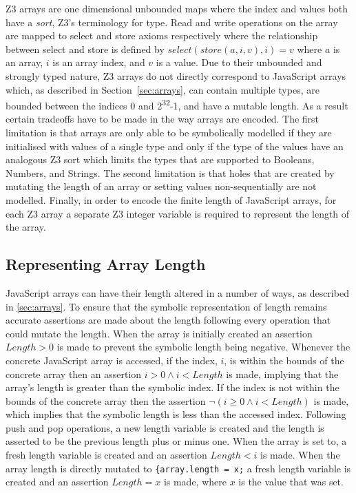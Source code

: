 \documentclass[]{final_report}
\begin{document}
Z3 arrays are one dimensional unbounded maps where the index and values both have a \textit{sort}, Z3's terminology for type. Read and write operations on the array are mapped to select and store axioms respectively where the relationship between select and store is defined by $select(store(a, i, v), i) = v$ where $a$ is an array, $i$ is an array index, and $v$ is a value. Due to their unbounded and strongly typed nature, Z3 arrays do not directly correspond to JavaScript arrays which, as described in Section~\ref{sec:arrays}, can contain multiple types, are bounded between the indices 0 and 2\textsuperscript{32}-1, and have a mutable length. As a result certain tradeoffs have to be made in the way arrays are encoded. The first limitation is that arrays are only able to be symbolically modelled if they are initialised with values of a single type and only if the type of the values have an analogous Z3 sort which limits the types that are supported to Booleans, Numbers, and Strings. The second limitation is that holes that are created by mutating the length of an array or setting values non-sequentially are not modelled. Finally, in order to encode the finite length of JavaScript arrays, for each Z3 array a separate Z3 integer variable is required to represent the length of the array. 

\subsection{Representing Array Length}
JavaScript arrays can have their length altered in a number of ways, as described in \ref{sec:arrays}. To ensure that the symbolic representation of length remains accurate assertions are made about the length following every operation that could mutate the length. 
When the array is initially created an assertion $Length > 0$ is made to prevent the symbolic length being negative. Whenever the concrete JavaScript array is accessed, if the index, $i$, is within the bounds of the concrete array then an assertion $i > 0 \land i < Length$ is made, implying that the array's length is greater than the symbolic index. If the index is not within the bounds of the concrete array then the assertion $\lnot{(i \geq 0 \land i < Length)}$ is made, which implies that the symbolic length is less than the accessed index. Following push and pop operations, a new length variable is created and the length is asserted to be the previous length plus or minus one. When the array is set to, a fresh length variable is created and an assertion $Length < i$ is made. When the array length is directly mutated to \lstinline|{array.length = x;| a fresh length variable is created and an assertion $Length = x$ is made, where $x$ is the value that was set.
\end{document}
